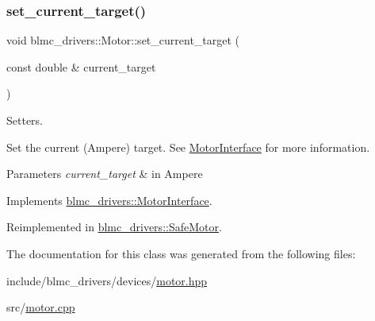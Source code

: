 \mbox{\label{classblmc__drivers_1_1Motor_a48801c9858a7b1784b0a0ac4272fdaf5}} 
\subsubsection{\texorpdfstring{set\+\_\+current\+\_\+target()}{set\_current\_target()}}
{\footnotesize\ttfamily void blmc\+\_\+drivers\+::\+Motor\+::set\+\_\+current\+\_\+target (\begin{DoxyParamCaption}\item[{const double \&}]{current\+\_\+target }\end{DoxyParamCaption})\hspace{0.3cm}{\ttfamily [virtual]}}



Setters. 

Set the current (Ampere) target. See \hyperlink{classblmc__drivers_1_1MotorInterface}{Motor\+Interface} for more information.


\begin{DoxyParams}{Parameters}
{\em current\+\_\+target} & in Ampere \\
\hline
\end{DoxyParams}


Implements \hyperlink{classblmc__drivers_1_1MotorInterface_a76b49a1228ad549fa407a54c8da14d13}{blmc\+\_\+drivers\+::\+Motor\+Interface}.



Reimplemented in \hyperlink{classblmc__drivers_1_1SafeMotor_adedaee24408b94b3d1ed8f856e218b12}{blmc\+\_\+drivers\+::\+Safe\+Motor}.



The documentation for this class was generated from the following files\+:\begin{DoxyCompactItemize}
\item 
include/blmc\+\_\+drivers/devices/\hyperlink{motor_8hpp}{motor.\+hpp}\item 
src/\hyperlink{motor_8cpp}{motor.\+cpp}\end{DoxyCompactItemize}

